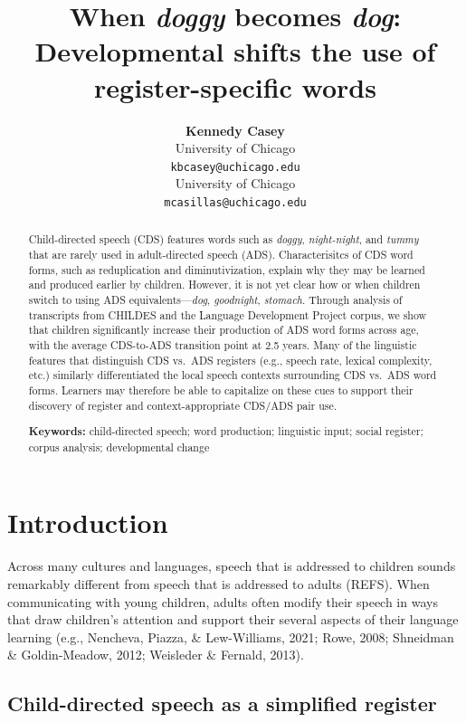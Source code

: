 \documentclass[10pt, letterpaper]{article}
\title{When \emph{doggy} becomes \emph{dog}: Developmental shifts the
use of register-specific words}
\author{{\large \bf Kennedy Casey} \\ University of Chicago \\ \texttt{kbcasey@uchicago.edu} \And {\large \bf Marisa Casillas} \\ University of Chicago \\ \texttt{mcasillas@uchicago.edu}}
\begin{document}
\maketitle

\begin{abstract}
Child-directed speech (CDS) features words such as \emph{doggy},
\emph{night-night}, and \emph{tummy} that are rarely used in
adult-directed speech (ADS). Characterisitcs of CDS word forms, such as
reduplication and diminutivization, explain why they may be learned and
produced earlier by children. However, it is not yet clear how or when
children switch to using ADS equivalents---\emph{dog}, \emph{goodnight},
\emph{stomach}. Through analysis of transcripts from CHILDES and the
Language Development Project corpus, we show that children significantly
increase their production of ADS word forms across age, with the average
CDS-to-ADS transition point at 2.5 years. Many of the linguistic
features that distinguish CDS vs.~ADS registers (e.g., speech rate,
lexical complexity, etc.) similarly differentiated the local speech
contexts surrounding CDS vs.~ADS word forms. Learners may therefore be
able to capitalize on these cues to support their discovery of register
and context-appropriate CDS/ADS pair use.

\textbf{Keywords:}
child-directed speech; word production; linguistic input; social
register; corpus analysis; developmental change
\end{abstract}

\hypertarget{introduction}{%
\section{Introduction}\label{introduction}}

Across many cultures and languages, speech that is addressed to children
sounds remarkably different from speech that is addressed to adults
(REFS). When communicating with young children, adults often modify
their speech in ways that draw children's attention and support their
several aspects of their language learning (e.g., Nencheva, Piazza, \&
Lew-Williams, 2021; Rowe, 2008; Shneidman \& Goldin-Meadow, 2012;
Weisleder \& Fernald, 2013).

\hypertarget{child-directed-speech-as-a-simplified-register}{%
\subsection{Child-directed speech as a simplified
register}\label{child-directed-speech-as-a-simplified-register}}
\end{document}

